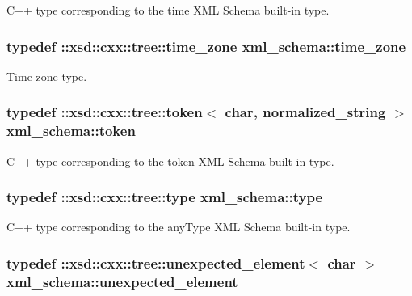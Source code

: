 C++ type corresponding to the time X\+M\+L Schema built-\/in type. 

\hypertarget{namespacexml__schema_a8e57a44a0fd5762cb4132689a635d6c3}{
\subsubsection[{time\+\_\+zone}]{\setlength{\rightskip}{0pt plus 5cm}typedef \+::xsd\+::cxx\+::tree\+::time\+\_\+zone {\bf xml\+\_\+schema\+::time\+\_\+zone}}}\label{namespacexml__schema_a8e57a44a0fd5762cb4132689a635d6c3}


Time zone type. 

\hypertarget{namespacexml__schema_abdb824cb755f58704a95b28f017dd0f7}{
\subsubsection[{token}]{\setlength{\rightskip}{0pt plus 5cm}typedef \+::xsd\+::cxx\+::tree\+::token$<$ char, {\bf normalized\+\_\+string} $>$ {\bf xml\+\_\+schema\+::token}}}\label{namespacexml__schema_abdb824cb755f58704a95b28f017dd0f7}


C++ type corresponding to the token X\+M\+L Schema built-\/in type. 

\hypertarget{namespacexml__schema_a3d277dc807f2e4ec4261dcef5c04a836}{
\subsubsection[{type}]{\setlength{\rightskip}{0pt plus 5cm}typedef \+::xsd\+::cxx\+::tree\+::type {\bf xml\+\_\+schema\+::type}}}\label{namespacexml__schema_a3d277dc807f2e4ec4261dcef5c04a836}


C++ type corresponding to the any\+Type X\+M\+L Schema built-\/in type. 

\hypertarget{namespacexml__schema_a55835ab195e4c70bc05de5bbac871110}{
\subsubsection[{unexpected\+\_\+element}]{\setlength{\rightskip}{0pt plus 5cm}typedef \+::xsd\+::cxx\+::tree\+::unexpected\+\_\+element$<$ char $>$ {\bf xml\+\_\+schema\+::unexpected\+\_\+element}}}\label{namespacexml__schema_a55835ab195e4c70bc05de5bbac871110}


